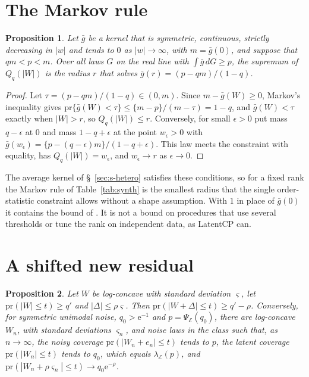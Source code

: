 \documentclass[11pt]{article}
\renewcommand{\_}{\usc\allowbreak}
\newtheorem{proposition}{Proposition}
\newcommand{\pr}{\mathrm{pr}}
\begin{document}
\section{The Markov rule}\label{sec:s-shapefree}

\begin{proposition}\label{prop:shapefree}
Let $\bar g$ be a kernel that is symmetric, continuous, strictly decreasing in $|w|$ and tends to $0$ as $|w| \to \infty$, with $m = \bar g(0)$, and suppose that $qm < p < m$. Over all laws $G$ on the real line with $\int \bar g\,dG \ge p$, the supremum of $Q_q(|W|)$ is the radius $r$ that solves $\bar g(r) = (p - qm)/(1 - q)$.
\end{proposition}

\begin{proof}
Let $\tau = (p - qm)/(1-q) \in (0, m)$. Since $m - \bar g(W) \ge 0$, Markov's inequality gives $\pr\{\bar g(W) < \tau\} \le \{m - p\}/(m - \tau) = 1 - q$, and $\bar g(W) < \tau$ exactly when $|W| > r$, so $Q_q(|W|) \le r$. Conversely, for small $\epsilon > 0$ put mass $q - \epsilon$ at $0$ and mass $1 - q + \epsilon$ at the point $w_\epsilon > 0$ with $\bar g(w_\epsilon) = \{p - (q - \epsilon)m\}/(1 - q + \epsilon)$. This law meets the constraint with equality, has $Q_q(|W|) = w_\epsilon$, and $w_\epsilon \to r$ as $\epsilon \to 0$.
\end{proof}

The average kernel of \S~\ref{sec:s-hetero} satisfies these conditions, so for a fixed rank the Markov rule of Table~\ref{tab:synth} is the smallest radius that the single order-statistic constraint allows without a shape assumption. With $1$ in place of $\bar g(0)$ it contains the bound of \citet{guille2024}. It is not a bound on procedures that use several thresholds or tune the rank on independent data, as LatentCP \citep{zheng2026} can.

\section{A shifted new residual}\label{sec:s-shift}

\begin{proposition}\label{prop:shift}
Let $W$ be log-concave with standard deviation $\varsigma$, let $\pr(|W| \le t) \ge q'$ and $|\Delta| \le \rho\varsigma$. Then $\pr(|W + \Delta| \le t) \ge q' - \rho$. Conversely, for symmetric unimodal noise, $q_0 > \mathrm{e}^{-1}$ and $p = \Psi_{\mathcal E}(q_0)$, there are log-concave $W_n$, with standard deviations $\varsigma_n$, and noise laws in the class such that, as $n \to \infty$, the noisy coverage $\pr(|W_n + e_n| \le t)$ tends to $p$, the latent coverage $\pr(|W_n| \le t)$ tends to $q_0$, which equals $\lambda_{\mathcal E}(p)$, and $\pr(|W_n + \rho\varsigma_n| \le t) \to q_0\mathrm{e}^{-\rho}$.
\end{proposition}
\end{document}

